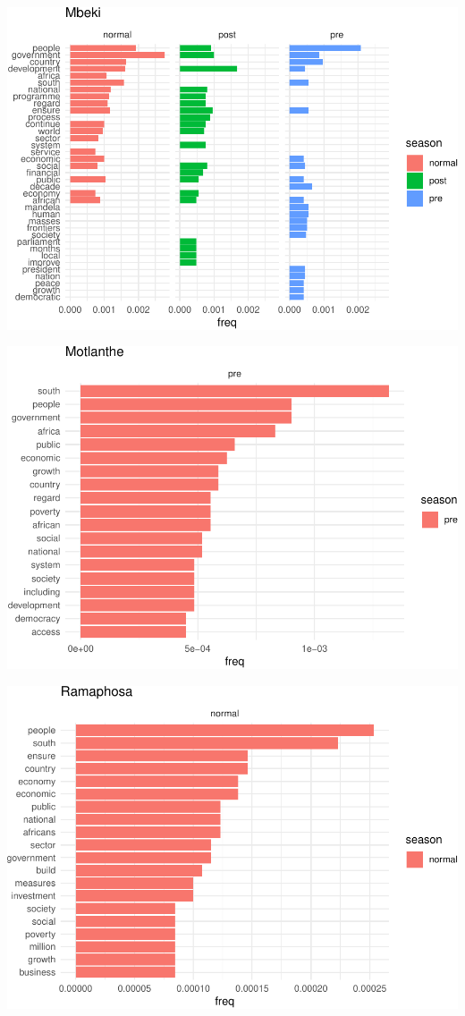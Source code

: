\documentclass[]{article}
\begin{document}
\begin{center}\includegraphics{datasci_fi_Assignment_2_files/figure-latex/mbeki -1} \end{center}

\begin{center}\includegraphics{datasci_fi_Assignment_2_files/figure-latex/Motlanthe -1} \end{center}

\begin{center}\includegraphics{datasci_fi_Assignment_2_files/figure-latex/Ramaphosa -1} \end{center}
\end{document}
